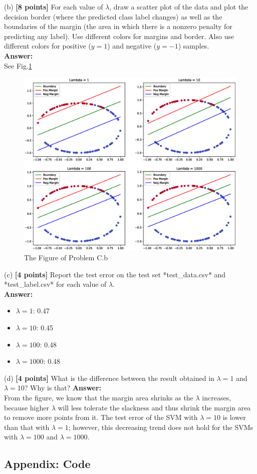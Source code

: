 (b) \textbf{[8 points]} For each value of $\lambda$, draw a scatter plot of the data and plot the decision border  (where
the predicted class label changes) as well as the boundaries of the margin (the area in which
there is a nonzero penalty for predicting any label). Use different colors for margins and border. Also use different colors for positive ($y=1$) and negative ($y=-1$) samples.\\
\textbf{Answer:}\\
See Fig.\ref{fig:svm}
\begin{figure}[!h]
	\centering
	\includegraphics[width=\textwidth]{./img/svm.eps}
	\caption{The Figure of Problem C.b}
	\label{fig:svm}
\end{figure}

(c) \textbf{[4 points]} Report the test error on the test set *test\_data.csv* and *test\_label.csv* for each value of $\lambda$.\\
\textbf{Answer:}\\
\begin{itemize}
	\item $\lambda = 1$: 0.47
	\item $\lambda = 10$: 0.45
	\item $\lambda = 100$: 0.48
	\item $\lambda = 1000$: 0.48
\end{itemize}

(d) \textbf{[4 points]} What is the difference between the result obtained in $\lambda=1$ and $\lambda=10$? Why is that?
\textbf{Answer:}\\
From the figure, we know that the margin area shrinks as the $\lambda$ increases, because higher $\lambda$ will less tolerate the slackness and thus shrink the margin area to remove more points from it. The test error of the SVM with $\lambda=10$ is lower than that with $\lambda=1$; however, this decreasing trend does not hold for the SVMs with $\lambda = 100$ and $\lambda = 1000$.

\newpage

\subsection*{Appendix: Code}


